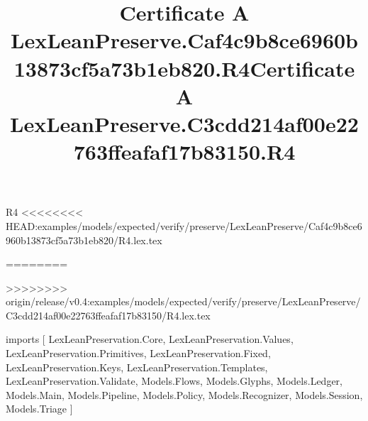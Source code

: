 \begin{lexlean}{R4}
<<<<<<<< HEAD:examples/models/expected/verify/preserve/LexLeanPreserve/Caf4c9b8ce6960b13873cf5a73b1eb820/R4.lex.tex
\title{Certificate A LexLeanPreserve.Caf4c9b8ce6960b13873cf5a73b1eb820.R4}
========
\title{Certificate A LexLeanPreserve.C3cdd214af00e22763ffeafaf17b83150.R4}
>>>>>>>> origin/release/v0.4:examples/models/expected/verify/preserve/LexLeanPreserve/C3cdd214af00e22763ffeafaf17b83150/R4.lex.tex
\begin{coremodule}
imports [
  LexLeanPreservation.Core,
  LexLeanPreservation.Values,
  LexLeanPreservation.Primitives,
  LexLeanPreservation.Fixed,
  LexLeanPreservation.Keys,
  LexLeanPreservation.Templates,
  LexLeanPreservation.Validate,
  Models.Flows,
  Models.Glyphs,
  Models.Ledger,
  Models.Main,
  Models.Pipeline,
  Models.Policy,
  Models.Recognizer,
  Models.Session,
  Models.Triage
]


\end{coremodule}
\end{lexlean}
